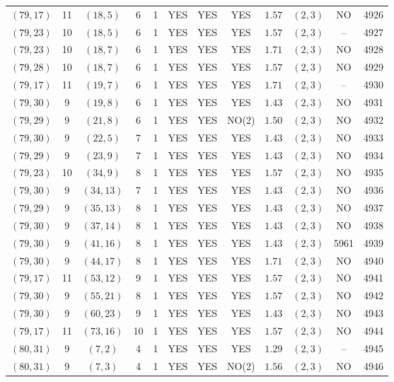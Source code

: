 \begin{longtable}{|c|c|c|c|c|c|c|c|c|c|c|c|}
$(79,17)$ & 11 & $(18,5)$ & 6 & 1 & YES & YES & YES & $1.57$ & $(2,3)$ & NO & 4926\\
$(79,23)$ & 10 & $(18,5)$ & 6 & 1 & YES & YES & YES & $1.57$ & $(2,3)$ & -- & 4927\\
$(79,23)$ & 10 & $(18,7)$ & 6 & 1 & YES & YES & YES & $1.71$ & $(2,3)$ & NO & 4928\\
$(79,28)$ & 10 & $(18,7)$ & 6 & 1 & YES & YES & YES & $1.57$ & $(2,3)$ & NO & 4929\\
$(79,17)$ & 11 & $(19,7)$ & 6 & 1 & YES & YES & YES & $1.71$ & $(2,3)$ & -- & 4930\\
$(79,30)$ & 9 & $(19,8)$ & 6 & 1 & YES & YES & YES & $1.43$ & $(2,3)$ & NO & 4931\\
$(79,29)$ & 9 & $(21,8)$ & 6 & 1 & YES & YES & NO(2) & $1.50$ & $(2,3)$ & NO & 4932\\
$(79,30)$ & 9 & $(22,5)$ & 7 & 1 & YES & YES & YES & $1.43$ & $(2,3)$ & NO & 4933\\
$(79,29)$ & 9 & $(23,9)$ & 7 & 1 & YES & YES & YES & $1.43$ & $(2,3)$ & NO & 4934\\
$(79,23)$ & 10 & $(34,9)$ & 8 & 1 & YES & YES & YES & $1.57$ & $(2,3)$ & NO & 4935\\
$(79,30)$ & 9 & $(34,13)$ & 7 & 1 & YES & YES & YES & $1.43$ & $(2,3)$ & NO & 4936\\
$(79,29)$ & 9 & $(35,13)$ & 8 & 1 & YES & YES & YES & $1.43$ & $(2,3)$ & NO & 4937\\
$(79,30)$ & 9 & $(37,14)$ & 8 & 1 & YES & YES & YES & $1.43$ & $(2,3)$ & NO & 4938\\
$(79,30)$ & 9 & $(41,16)$ & 8 & 1 & YES & YES & YES & $1.43$ & $(2,3)$ & 5961 & 4939\\
$(79,30)$ & 9 & $(44,17)$ & 8 & 1 & YES & YES & YES & $1.71$ & $(2,3)$ & NO & 4940\\
$(79,17)$ & 11 & $(53,12)$ & 9 & 1 & YES & YES & YES & $1.57$ & $(2,3)$ & NO & 4941\\
$(79,30)$ & 9 & $(55,21)$ & 8 & 1 & YES & YES & YES & $1.57$ & $(2,3)$ & NO & 4942\\
$(79,30)$ & 9 & $(60,23)$ & 9 & 1 & YES & YES & YES & $1.43$ & $(2,3)$ & NO & 4943\\
$(79,17)$ & 11 & $(73,16)$ & 10 & 1 & YES & YES & YES & $1.57$ & $(2,3)$ & NO & 4944\\
$(80,31)$ & 9 & $(7,2)$ & 4 & 1 & YES & YES & YES & $1.29$ & $(2,3)$ & -- & 4945\\
$(80,31)$ & 9 & $(7,3)$ & 4 & 1 & YES & YES & NO(2) & $1.56$ & $(2,3)$ & NO & 4946\\

\end{longtable}
